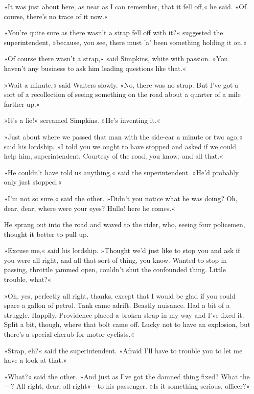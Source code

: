 »It was just about here, as near as I can remember, that it fell off,« he said. »Of course, there's no trace of it now.«

»You're quite sure as there wasn't a strap fell off with it?« suggested the superintendent, »because, you see, there must 'a' been something holding it on.«

»Of course there wasn't a strap,« said Simpkins, white with passion. »You haven't any business to ask him leading questions like that.«

»Wait a minute,« said Walters slowly. »No, there was no strap. But I've got a sort of a recollection of seeing something on the road about a quarter of a mile farther up.«

»It's a lie!« screamed Simpkins. »He's inventing it.«

»Just about where we passed that man with the side-car a minute or two ago,« said his lordship. »I told you we ought to have stopped and asked if we could help him, superintendent. Courtesy of the road, you know, and all that.«

»He couldn't have told us anything,« said the superintendent. »He'd probably only just stopped.«

»I'm not so sure,« said the other. »Didn't you notice what he was doing? Oh, dear, dear, where were your eyes? Hullo! here he comes.«

He sprang out into the road and waved to the rider, who, seeing four policemen, thought it better to pull up.

»Excuse me,« said his lordship. »Thought we'd just like to stop you and ask if you were all right, and all that sort of thing, you know. Wanted to stop in passing, throttle jammed open, couldn't shut the confounded thing. Little trouble, what?«

»Oh, yes, perfectly all right, thanks, except that I would be glad if you could spare a gallon of petrol. Tank came adrift. Beastly nuisance. Had a bit of a struggle. Happily, Providence placed a broken strap in my way and I've fixed it. Split a bit, though, where that bolt came off. Lucky not to have an explosion, but there's a special cherub for motor-cyclists.«

»Strap, eh?« said the superintendent. »Afraid I'll have to trouble you to let me have a look at that.«

»What?« said the other. »And just as I've got the damned thing fixed? What the—? All right, dear, all right«—to his passenger. »Is it something serious, officer?«

